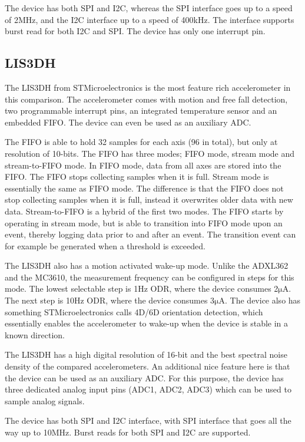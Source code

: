 The device has both SPI and I2C, whereas the SPI interface goes up to a speed of 2MHz, and the I2C interface up to a speed of 400kHz. The interface supports burst read for both I2C and SPI. The device has only one interrupt pin.

\subsection{LIS3DH}

The LIS3DH from STMicroelectronics is the most feature rich accelerometer in this comparison. The accelerometer comes with motion and free fall detection, two programmable interrupt pins, an integrated temperature sensor and an embedded FIFO. The device can even be used as an auxiliary ADC.

The FIFO is able to hold 32 samples for each axis (96 in total), but only at resolution of 10-bits. The FIFO has three modes; FIFO mode, stream mode and stream-to-FIFO mode. In FIFO mode, data from all axes are stored into the FIFO. The FIFO stops collecting samples when it is full. Stream mode is essentially the same as FIFO mode. The difference is that the FIFO does not stop collecting samples when it is full, instead it overwrites older data with new data. Stream-to-FIFO is a hybrid of the first two modes. The FIFO starts by operating in stream mode, but is able to transition into FIFO mode upon an event, thereby logging data prior to and after an event. The transition event can for example be generated when a threshold is exceeded.

The LIS3DH also has a motion activated wake-up mode. Unlike the ADXL362 and the MC3610, the measurement frequency can be configured in steps for this mode. The lowest selectable step is 1Hz ODR, where the device consumes 2$\si{\micro\ampere}$. The next step is 10Hz ODR, where the device consumes 3$\si{\micro\ampere}$. The device also has something STMicroelectronics calls 4D/6D orientation detection, which essentially enables the accelerometer to wake-up when the device is stable in a known direction. 

The LIS3DH has a high digital resolution of 16-bit and the best spectral noise density of the compared accelerometers. An additional nice feature here is that the device can be used as an auxiliary ADC. For this purpose, the device has three dedicated analog input pins (ADC1, ADC2, ADC3) which can be used to sample analog signals. 

The device has both SPI and I2C interface, with SPI interface that goes all the way up to 10MHz. Burst reads for both SPI and I2C are supported.

